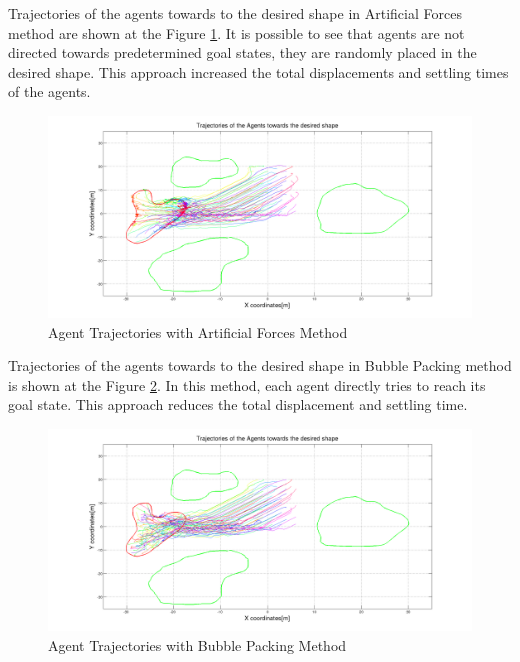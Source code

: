 \documentclass[letterpaper, 10 pt, conference]{ieeeconf}  %
\begin{document}
Trajectories of the agents towards to the desired shape in Artificial Forces method are shown at the Figure \ref{arto1}. It is possible to see that agents are not directed towards predetermined goal states, they are randomly placed in the desired shape. This approach increased the total displacements and settling times of the agents.		

\begin{figure}[thpb]
\caption{Agent Trajectories with Artificial Forces Method} \label{arto1}
\centerline{\includegraphics[scale = 0.15]{Aritificial_Trajecories_1}}
\end{figure} 	
 
 Trajectories of the agents towards to the desired shape in Bubble Packing method is shown at the Figure \ref{bubble1}. In this method, each agent directly tries to reach its goal state. This approach reduces the total displacement and settling time.

\begin{figure}[thpb]
\caption{Agent Trajectories with Bubble Packing Method}
\centerline{\includegraphics[scale = 0.15]{Bubble_Trajectories_1}} \label{bubble1}
\end{figure}
			
\end{document}
